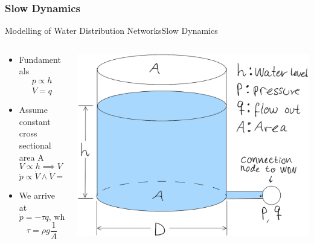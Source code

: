 \subsubsection{Slow Dynamics}

\begin{frame}{Modelling of Water Distribution Networks}{Slow Dynamics}
	\begin{columns}
		\begin{column}{.5\textwidth}
			\begin{itemize}
				\item Fundamentals
				\begin{equation*}
					p \propto h 
				\end{equation*}
				\begin{equation*}
					\dot{V} = q
				\end{equation*}
				\item Assume constant cross sectional area A
				\begin{equation*}
					V \propto h \implies V \propto p 
				\end{equation*}
				\begin{equation*}
					\dot{p} \propto \dot{V} \wedge \dot{V} = q \implies \dot{p} \propto q
				\end{equation*}
				\item We arrive at
				\begin{equation*}
					\dot{p} = -\tau q \text{,  where}
				\end{equation*}	
				\begin{equation*}
					\tau = \rho g \frac{1}{A}
				\end{equation*}	
			\end{itemize}
		\end{column}
		\begin{column}{.5\textwidth}\raggedleft
			\includegraphics[width=1\linewidth]{Topics/SlowDynamicsLinearisation/Graphics/Tank_sketch.png}
		\end{column}
	\end{columns}
\end{frame}

